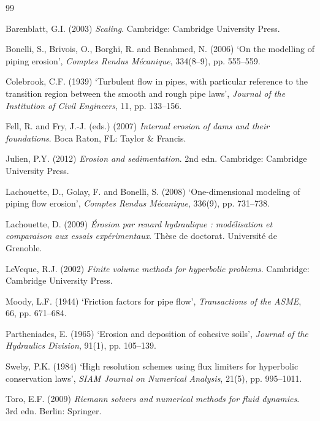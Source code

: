 \documentclass[11pt,a4paper]{report}
\begin{document}
\begin{thebibliography}{99}

Barenblatt, G.I. (2003) \emph{Scaling}. Cambridge: Cambridge University Press.

Bonelli, S., Brivois, O., Borghi, R. and Benahmed, N. (2006) `On the modelling of piping erosion',
\emph{Comptes Rendus Mécanique}, 334(8--9), pp. 555--559.

Colebrook, C.F. (1939) `Turbulent flow in pipes, with particular reference to the transition region
between the smooth and rough pipe laws', \emph{Journal of the Institution of Civil Engineers}, 11,
pp. 133--156.

Fell, R. and Fry, J.-J. (eds.) (2007) \emph{Internal erosion of dams and their foundations}. Boca Raton,
FL: Taylor \& Francis.

Julien, P.Y. (2012) \emph{Erosion and sedimentation}. 2nd edn. Cambridge: Cambridge University Press.

Lachouette, D., Golay, F. and Bonelli, S. (2008) `One-dimensional modeling of piping flow erosion',
\emph{Comptes Rendus Mécanique}, 336(9), pp. 731--738.

Lachouette, D. (2009) \emph{Érosion par renard hydraulique : modélisation et comparaison aux essais
expérimentaux}. Thèse de doctorat. Université de Grenoble.

LeVeque, R.J. (2002) \emph{Finite volume methods for hyperbolic problems}. Cambridge: Cambridge
University Press.

Moody, L.F. (1944) `Friction factors for pipe flow', \emph{Transactions of the ASME}, 66, pp. 671--684.

Partheniades, E. (1965) `Erosion and deposition of cohesive soils', \emph{Journal of the Hydraulics
Division}, 91(1), pp. 105--139.

Sweby, P.K. (1984) `High resolution schemes using flux limiters for hyperbolic conservation laws',
\emph{SIAM Journal on Numerical Analysis}, 21(5), pp. 995--1011.

Toro, E.F. (2009) \emph{Riemann solvers and numerical methods for fluid dynamics}. 3rd edn. Berlin:
Springer.


\end{thebibliography}
\end{document}

